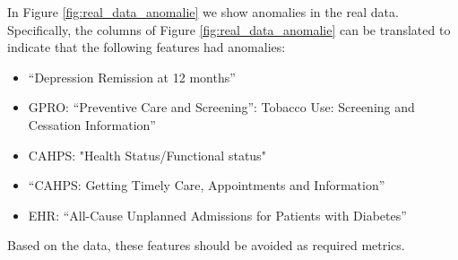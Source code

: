 \documentclass[conference]{IEEEtran}
\begin{document}
In Figure \ref {fig:real_data_anomalie}
we show anomalies in the real data.  Specifically, the columns of Figure \ref {fig:real_data_anomalie} can be translated to indicate that the following features had anomalies: 

\begin{itemize}
\item 
“Depression Remission at 12 months”

\item 
GPRO: “Preventive Care and Screening”: Tobacco Use: Screening and Cessation Information”  %

\item 
CAHPS: "Health Status/Functional status"
\item 
“CAHPS: Getting Timely Care, Appointments and Information”

\item 
EHR: “All-Cause Unplanned Admissions for Patients with Diabetes”
\end{itemize}

Based on the data, these features should be avoided as required metrics.


\end{document}
